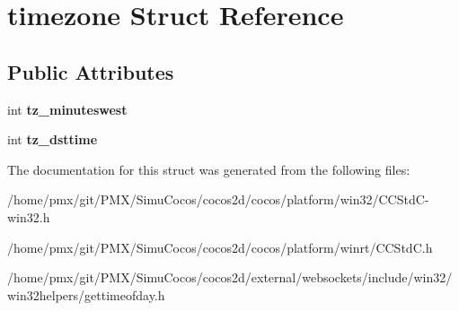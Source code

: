 \hypertarget{structtimezone}{}\section{timezone Struct Reference}
\label{structtimezone}
\subsection*{Public Attributes}
\begin{DoxyCompactItemize}
\item 
\mbox{\label{structtimezone_a3042f7eff6e1b980728def76b1fa0eb7}} 
int {\bfseries tz\+\_\+minuteswest}
\item 
\mbox{\label{structtimezone_a85259977aeb63b17e6ce94f19afdfd99}} 
int {\bfseries tz\+\_\+dsttime}
\end{DoxyCompactItemize}


The documentation for this struct was generated from the following files\+:\begin{DoxyCompactItemize}
\item 
/home/pmx/git/\+P\+M\+X/\+Simu\+Cocos/cocos2d/cocos/platform/win32/C\+C\+Std\+C-\/win32.\+h\item 
/home/pmx/git/\+P\+M\+X/\+Simu\+Cocos/cocos2d/cocos/platform/winrt/C\+C\+Std\+C.\+h\item 
/home/pmx/git/\+P\+M\+X/\+Simu\+Cocos/cocos2d/external/websockets/include/win32/win32helpers/gettimeofday.\+h\end{DoxyCompactItemize}
